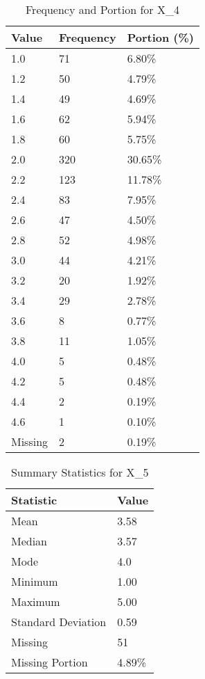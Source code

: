 \begin{table}[H]
\centering
\begin{tabular}{|l|l|l|}
\hline
\textbf{Value} & \textbf{Frequency} & \textbf{Portion (\%)} \\ \hline
1.0 & 71 & 6.80\% \\ \hline
1.2 & 50 & 4.79\% \\ \hline
1.4 & 49 & 4.69\% \\ \hline
1.6 & 62 & 5.94\% \\ \hline
1.8 & 60 & 5.75\% \\ \hline
2.0 & 320 & 30.65\% \\ \hline
2.2 & 123 & 11.78\% \\ \hline
2.4 & 83 & 7.95\% \\ \hline
2.6 & 47 & 4.50\% \\ \hline
2.8 & 52 & 4.98\% \\ \hline
3.0 & 44 & 4.21\% \\ \hline
3.2 & 20 & 1.92\% \\ \hline
3.4 & 29 & 2.78\% \\ \hline
3.6 & 8 & 0.77\% \\ \hline
3.8 & 11 & 1.05\% \\ \hline
4.0 & 5 & 0.48\% \\ \hline
4.2 & 5 & 0.48\% \\ \hline
4.4 & 2 & 0.19\% \\ \hline
4.6 & 1 & 0.10\% \\ \hline
Missing & 2 & 0.19\% \\ \hline
\end{tabular}
\caption{Frequency and Portion for X_4}
\end{table}

\begin{table}[H]
\centering
\begin{tabular}{|l|l|}
\hline
\textbf{Statistic} & \textbf{Value} \\ \hline
Mean               & 3.58 \\ \hline
Median             & 3.57 \\ \hline
Mode               & 4.0 \\ \hline
Minimum            & 1.00 \\ \hline
Maximum            & 5.00 \\ \hline
Standard Deviation & 0.59 \\ \hline
Missing            & 51 \\ \hline
Missing Portion    & 4.89\% \\ \hline
\end{tabular}
\caption{Summary Statistics for X_5}
\end{table}

